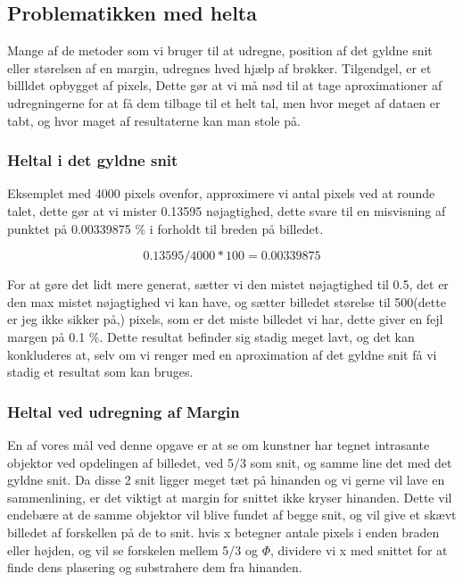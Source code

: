 \subsection*{Problematikken med helta}
Mange af de metoder som vi bruger til at udregne, position af det gyldne
snit eller størelsen af en margin, udregnes hved hjælp af brøkker.
Tilgendgel, er et billldet opbygget af pixels, Dette gør at vi må nød
til at tage aproximationer af udregningerne for at få dem tilbage til et
helt tal, men hvor meget af dataen er tabt, og hvor maget af
resultaterne kan man stole på.

\subsubsection*{Heltal i det gyldne snit}
Eksemplet med 4000 pixels ovenfor, approximere vi antal pixels ved at
rounde talet, dette gør at vi mister 0.13595 nøjagtighed, dette svare
til en misvisning af punktet på 0.00339875 $\%$ i forholdt til breden på
billedet. 

\begin{equation}
	0.13595/4000*100 = 0.00339875
\end{equation}

For at gøre det lidt mere generat, sætter vi den mistet nøjagtighed til
0.5, det er den max mistet nøjagtighed vi kan have, og sætter billedet
størelse til 500(dette er jeg ikke sikker på,) pixels, som er det miste
billedet vi har, dette giver en fejl margen på 0.1 $\%$. Dette resultat
befinder sig stadig meget lavt, og det kan konkluderes at, selv om vi
renger med en aproximation af det gyldne snit få vi stadig et resultat
som kan bruges.

\subsubsection{Heltal ved udregning af Margin}
En af vores mål ved denne opgave er at se om kunstner har tegnet
intrasante objektor ved opdelingen af billedet, ved 5/3 som snit, og
samme line det med det gyldne snit. Da disse 2 snit ligger meget tæt på
hinanden og vi gerne vil lave en sammenlining, er det viktigt at margin
for snittet ikke kryser hinanden. Dette vil endebære at de samme
objektor vil blive fundet af begge snit, og vil give et skævt billedet
af forskellen på de to snit.
hvis x betegner antale pixels i enden braden eller højden, og vil se
forskelen mellem 5/3 og $\Phi$, dividere vi x med snittet for at finde
dens plasering og substrahere dem fra hinanden.

